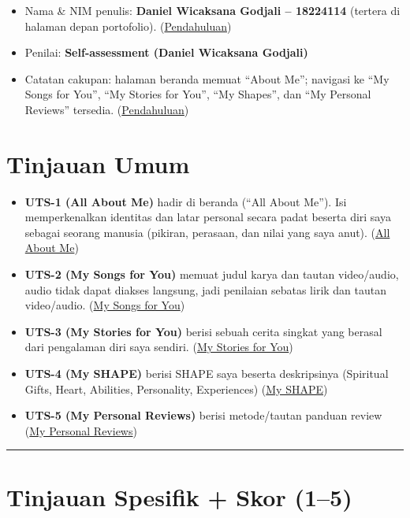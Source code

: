 \documentclass[
  letterpaper,
  DIV=11,
  numbers=noendperiod]{scrreprt}
\providecommand{\tightlist}{%
  \setlength{\itemsep}{0pt}\setlength{\parskip}{0pt}}
\begin{document}
\begin{itemize}
\tightlist
\item
  Nama \& NIM penulis: \textbf{Daniel Wicaksana Godjali -- 18224114}
  (tertera di halaman depan portofolio).
  (\hyperref[pendahuluan]{Pendahuluan})
\item
  Penilai: \textbf{Self-assessment (Daniel Wicaksana Godjali)}
\item
  Catatan cakupan: halaman beranda memuat ``About Me''; navigasi ke ``My
  Songs for You'', ``My Stories for You'', ``My Shapes'', dan ``My
  Personal Reviews'' tersedia. (\hyperref[pendahuluan]{Pendahuluan})
\end{itemize}

\section{Tinjauan Umum}\label{tinjauan-umum}

\begin{itemize}
\tightlist
\item
  \textbf{UTS-1 (All About Me)} hadir di beranda (``All About Me''). Isi
  memperkenalkan identitas dan latar personal secara padat beserta diri
  saya sebagai seorang manusia (pikiran, perasaan, dan nilai yang saya
  anut). (\hyperref[uts-1-all-about-me]{All About Me})
\item
  \textbf{UTS-2 (My Songs for You)} memuat judul karya dan tautan
  video/audio, audio tidak dapat diakses langsung, jadi penilaian
  sebatas lirik dan tautan video/audio.
  (\hyperref[uts-2-my-songs-for-you]{My Songs for You})
\item
  \textbf{UTS-3 (My Stories for You)} berisi sebuah cerita singkat yang
  berasal dari pengalaman diri saya sendiri.
  (\hyperref[uts-3-my-stories-for-you]{My Stories for You})
\item
  \textbf{UTS-4 (My SHAPE)} berisi SHAPE saya beserta deskripsinya
  (Spiritual Gifts, Heart, Abilities, Personality, Experiences)
  (\hyperref[uts-4-my-shape-spiritual-gifts-heart-abilities-personality-experiences]{My
  SHAPE})
\item
  \textbf{UTS-5 (My Personal Reviews)} berisi metode/tautan panduan
  review (\hyperref[uts-5-my-personal-reviews]{My Personal Reviews})
\end{itemize}

\begin{center}\rule{0.5\linewidth}{0.5pt}\end{center}

\section{Tinjauan Spesifik + Skor
(1--5)}\label{tinjauan-spesifik-skor-15}
\end{document}
